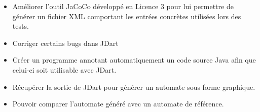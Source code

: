\begin{itemize}
\item Améliorer l'outil JaCoCo développé en Licence 3 pour lui
  permettre de générer un fichier XML comportant les entrées concrètes
  utilisées lors des tests.
\item Corriger certains bugs dans JDart
\item Créer un programme annotant automatiquement un code source Java
  afin que celui-ci soit utilisable avec JDart.
\item Récupérer la sortie de JDart pour générer un automate sous forme
  graphique.
\item Pouvoir comparer l'automate généré avec un automate de
  référence.
\end{itemize}
